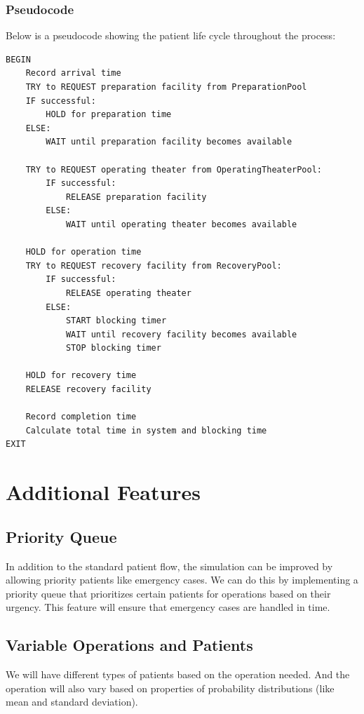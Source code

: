 \documentclass{article}
\begin{document}
\subsubsection{Pseudocode}

Below is a pseudocode showing the patient life cycle throughout the process: 

\begin{verbatim}
BEGIN
    Record arrival time
    TRY to REQUEST preparation facility from PreparationPool
    IF successful:
        HOLD for preparation time
    ELSE:
        WAIT until preparation facility becomes available

    TRY to REQUEST operating theater from OperatingTheaterPool:
        IF successful:
            RELEASE preparation facility
        ELSE:
            WAIT until operating theater becomes available

    HOLD for operation time
    TRY to REQUEST recovery facility from RecoveryPool:
        IF successful:
            RELEASE operating theater
        ELSE:
            START blocking timer
            WAIT until recovery facility becomes available
            STOP blocking timer

    HOLD for recovery time
    RELEASE recovery facility
    
    Record completion time
    Calculate total time in system and blocking time
EXIT
\end{verbatim}

\section{Additional Features}

\subsection{Priority Queue}
In addition to the standard patient flow, the simulation can be improved by allowing priority patients like emergency cases. We can do this by implementing a priority 
queue that prioritizes certain patients for operations based on their urgency. This feature will ensure that emergency cases are handled in time.

\subsection{Variable Operations and Patients}
We will have different types of patients based on the operation needed. And the operation will also vary based on properties of probability 
distributions (like mean and standard deviation).
\end{document}
